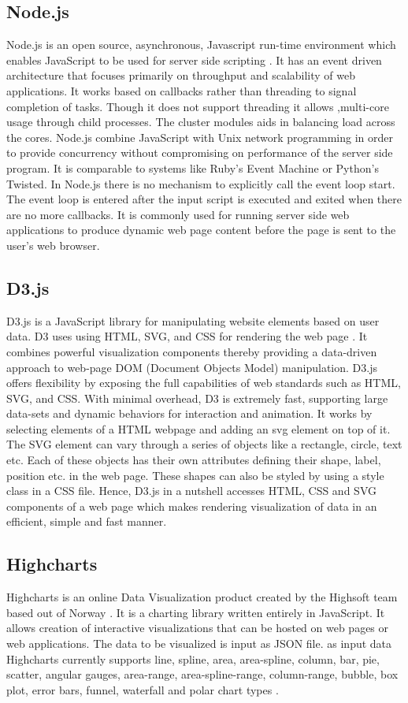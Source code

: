 \documentclass[9pt,twocolumn,twoside]{../../styles/osajnl}
\begin{document}
\subsection{Node.js}
Node.js is an open source, asynchronous, Javascript run-time environment which enables JavaScript to be used for server side scripting \cite{www-nodejs}. It has an event driven architecture that focuses primarily on throughput and scalability of web applications. It works based on callbacks rather than threading to signal completion of tasks. Though it does not support threading it allows ,multi-core  usage through child processes. The cluster modules aids in balancing load across the cores. Node.js combine JavaScript with Unix network programming in order to provide concurrency without compromising on performance of the server side program. It is comparable to systems like Ruby's Event Machine or Python's Twisted. In Node.js there is no mechanism to explicitly call the event loop start. The event loop is entered after the input script is executed and exited when there are no more callbacks. It is commonly used for running server side web applications to produce dynamic web page content before the page is sent to the user's web browser.
\subsection{D3.js}
D3.js is a JavaScript library for manipulating website elements based on user data. D3 uses using HTML, SVG, and CSS for rendering the web page \cite{www-d3-web}. It combines powerful visualization components thereby providing a data-driven approach to web-page DOM (Document Objects Model) manipulation. D3.js offers flexibility by exposing the full capabilities of web standards such as HTML, SVG, and CSS. With minimal overhead, D3 is extremely fast, supporting large data-sets and dynamic behaviors for interaction and animation. It works by selecting elements of a HTML webpage and adding an svg element on top of it. The SVG element can vary through a series of objects like a rectangle, circle, text etc. Each of these objects has their own attributes defining their shape, label, position etc. in the web page. These shapes can also be styled by using a style class in a CSS file. Hence, D3.js in a nutshell accesses HTML, CSS and SVG components of a web page which makes rendering visualization of data in an efficient, simple and fast manner.
\subsection{Highcharts}
Highcharts is an online Data Visualization product created by the Highsoft team based out of Norway \cite{www-highwiki}. It is a charting library written entirely in JavaScript. It allows creation of interactive visualizations that can be hosted on web pages or web applications. The data to be visualized is input as JSON file. as input data Highcharts currently supports line, spline, area, area-spline, column, bar, pie, scatter, angular gauges, area-range, area-spline-range, column-range, bubble, box plot, error bars, funnel, waterfall and polar chart types  \cite{www-Highcharts}.
\end{document}
